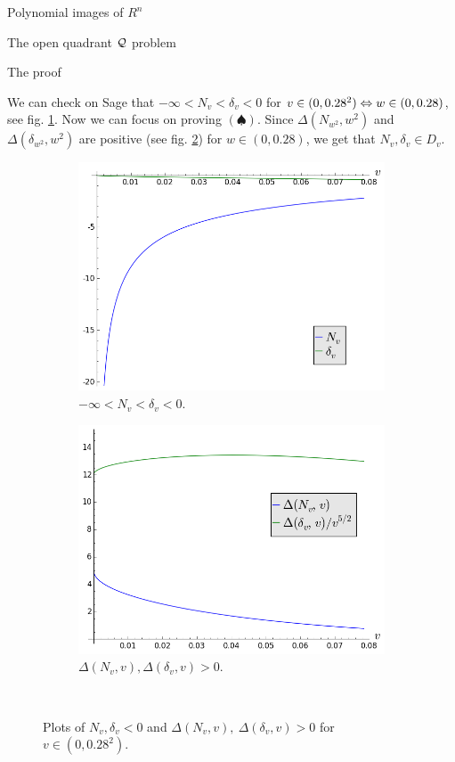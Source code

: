 \documentclass[11pt, a4paper, english, twoside, notitlepage]{report}
\begin{document}
\begin{chapter}{Polynomial images of $R^n$}
\begin{section}{The open quadrant $\mathcal{Q}$ problem}
\begin{subsection}{The proof}
\begin{Proof}
			We can check on Sage that $-\infty<N_v<\delta_v<0$ for $v \in (0, 0.28^2) \Leftrightarrow w \in (0, 0.28)$, see fig. \ref{fig:comp}. Now we can focus on proving $(\spadesuit)$. Since $\Delta(N_{w^2}, w^2)$ and $\Delta(\delta_{w^2}, w^2)$ are positive (see fig. \ref{fig:positive}) for $w \in (0, 0.28)$, we get that $N_v, \delta_v\in D_v$.
		\begin{figure}[h]\hspace{-1cm}
			\begin{subfigure}{.56\linewidth}\centering
				\includegraphics[width=1\textwidth]{plots/ch1_13_comp.png}
				\caption{$-\infty<N_v<\delta_v<0$.\label{fig:comp}}
			\end{subfigure}
			\begin{subfigure}{.6\linewidth}\centering
				\includegraphics[width=1\textwidth]{plots/ch1_14_positive.png}
				\caption{$\Delta(N_{v}, v), \Delta(\delta_{v},v) > 0$.\label{fig:positive}}
			\end{subfigure}\\[1ex]
			\caption{Plots of $N_v,\delta_v < 0$ and $\Delta(N_{v}, v),\ \Delta(\delta_{v},v) > 0$ for $v \in (0, 0.28^2)$.\label{fig:N_delta}}
		\end{figure}


\end{Proof}
\end{subsection}
\end{section}
\end{chapter}
\end{document}
